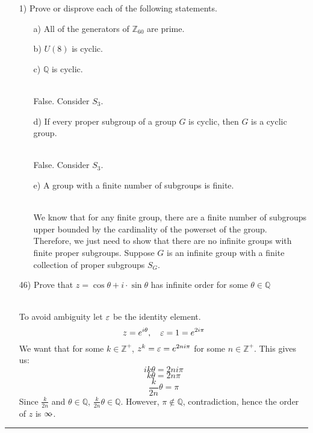 \documentclass[11pt]{article}
\let\oriinfty=\infty
\def\infty{{\oriinfty\llap{\vrule height.24em depth-.2em width.2em}}}
\begin{document}
\begin{itemize}
    \item[1)] Prove or disprove each of the following statements.
    \begin{itemize}
        \item [a)]All of the generators of $\mathbb{Z}_{60}$ are prime.
        \item [b)] $U(8)$ is cyclic.
        \item [c)]$\mathbb{Q}$ is cyclic.
        \begin{solution} \hfill \\
            False. Consider $S_3$.
        \end{solution}
        \item [d)]If every proper subgroup of a group $G$ is cyclic, then $G$ is a cyclic group.
        \begin{solution} \hfill \\
            False. Consider $S_3$.
        \end{solution}
        \item [e)]A group with a finite number of subgroups is finite.
        \begin{solution} \hfill \\
            We know that for any finite group, there are a finite number of subgroups upper bounded by the cardinality of the powerset of the group.\\
            Therefore, we just need to show that there are no infinite groups with finite proper subgroups. Suppose $G$ is an infinite group with a finite collection of proper subgroups $S_G$.
        \end{solution}

    \end{itemize}
    \item[46)] Prove that $z=\cos\theta + i\cdot \sin\theta$ has infinite order for some $\theta \in \mathbb{Q}$\\
    \begin{solution} \hfill \\
        To avoid ambiguity let $\varepsilon$ be the identity element.
        $$z=e^{i\theta}, \quad \varepsilon=1=e^{2i\pi}$$
        We want that for some $k\in \mathbb{Z}^+$, $z^k=\varepsilon=e^{2ni\pi}$ for some $n\in \mathbb{Z}^+$. This gives us:
        $$ik\theta=2ni\pi$$
        $$k\theta=2n\pi$$
        $$\frac{k}{2n}\theta=\pi$$
        Since $\frac{k}{2n}$ and $\theta \in \mathbb{Q}$, $\frac{k}{2n}\theta \in \mathbb{Q}$. However, $\pi \notin \mathbb{Q}$, contradiction,
        hence the order of $z$ is $\infty$.
    \end{solution}
\end{itemize}
\vspace{6pt}
\hrule
\vspace{6pt}
\end{document}
